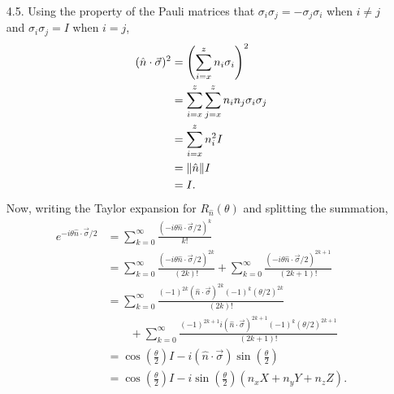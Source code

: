 \documentclass[a4paper,12pt]{article}
\begin{document}
\begin{enumerate}
    \item[4.5.] Using the property of the Pauli matrices that $\sigma_i \sigma_j = -\sigma_j \sigma_i$ when $i \neq j$ and $\sigma_i \sigma_j = I$ when $i = j$,
        \begin{align*}
            (\hat{n} \cdot \vec{\sigma})^2 &= \left( \sum_{i = x}^{z} n_i \sigma_i \right)^2 \\
            &= \sum_{i = x}^{z} \sum_{j = x}^{z} n_i n_j \sigma_i \sigma_j \\
            &= \sum_{i = x}^{z} n_i^2 I \\
            &= \norm{\hat{n}} I \\
            &= I.
        \end{align*}
        Now, writing the Taylor expansion for $R_{\hat{n}}(\theta)$ and splitting the summation,
        \begin{align*}
            e^{-i\theta \hat{n} \cdot \vec{\sigma} / 2} &= \sum_{k = 0}^{\infty} \frac{(-i\theta \hat{n} \cdot \vec{\sigma} / 2)^k}{k!} \\
            &= \sum_{k = 0}^{\infty} \frac{(-i\theta \hat{n} \cdot \vec{\sigma} / 2)^{2k}}{(2k)!} + \sum_{k = 0}^{\infty} \frac{(-i\theta \hat{n} \cdot \vec{\sigma} / 2)^{2k+ 1}}{(2k + 1)!} \\
            &= \sum_{k = 0}^{\infty} \frac{(-1)^{2k} (\hat{n} \cdot \vec{\sigma})^{2k} (-1)^k (\theta / 2)^{2k}}{(2k)!} \\
            &\qquad+ \sum_{k = 0}^{\infty} \frac{(-1)^{2k + 1} i (\hat{n} \cdot \vec{\sigma})^{2k + 1} (-1)^k (\theta / 2)^{2k + 1}}{(2k + 1)!} \\
            &= \cos{\left(\frac{\theta}{2}\right)} I - i(\hat{n} \cdot \vec{\sigma}) \sin{\left(\frac{\theta}{2}\right)} \\
            &= \cos{\left(\frac{\theta}{2}\right)} I - i\sin{\left(\frac{\theta}{2}\right)} (n_x X + n_y Y + n_z Z).
        \end{align*}


\end{enumerate}
\end{document}
